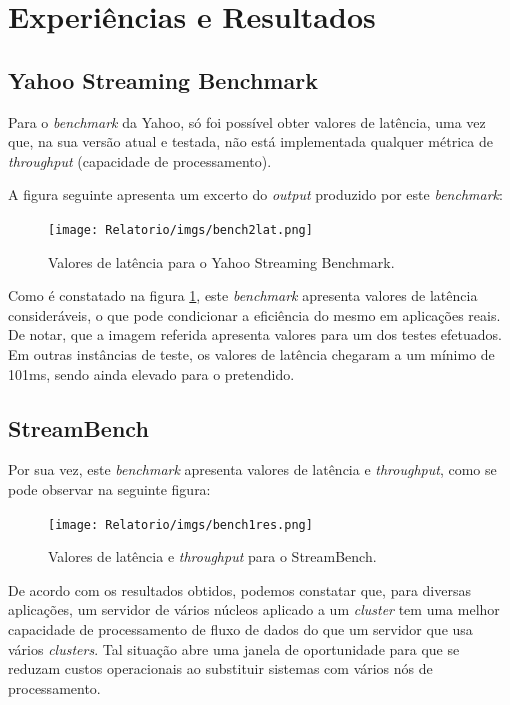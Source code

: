 \documentclass[conference]{IEEEtran}
\begin{document}
\section{Experiências e Resultados}
\label{resultados}

\subsection{Yahoo Streaming Benchmark}
\label{yahoo}

Para o \emph{benchmark} da Yahoo, só foi possível obter valores de latência, uma vez que, na sua versão atual e testada, não está implementada qualquer métrica de \emph{throughput} (capacidade de processamento). 

A figura seguinte apresenta um excerto do \emph{output} produzido por este \emph{benchmark}:

\begin{figure}[!htbp]
\centering
\texttt{[image: Relatorio/imgs/bench2lat.png]}
\caption{Valores de latência para o Yahoo Streaming Benchmark.}
\label{yahoo_res}
\end{figure}

Como é constatado na figura \ref{yahoo_res}, este \emph{benchmark} apresenta valores de latência consideráveis, o que pode condicionar a eficiência do mesmo em aplicações reais. De notar, que a imagem referida apresenta valores para um dos testes efetuados. Em outras instâncias de teste, os valores de latência chegaram a um mínimo de 101ms, sendo ainda elevado para o pretendido.

\subsection{StreamBench}
\label{stream}

Por sua vez, este \emph{benchmark} apresenta valores de latência e \emph{throughput}, como se pode observar na seguinte figura:

\begin{figure}[!htbp]
\centering
\texttt{[image: Relatorio/imgs/bench1res.png]}
\caption{Valores de latência e \emph{throughput} para o StreamBench.}
\label{stream_res}
\end{figure}

De acordo com os resultados obtidos, podemos constatar que, para diversas aplicações, um servidor de vários núcleos aplicado a um \emph{cluster} tem uma melhor capacidade de processamento de fluxo de dados do que um servidor que usa vários \emph{clusters}. Tal situação abre uma janela de oportunidade para que se reduzam custos operacionais ao substituir sistemas com vários nós de processamento.
\end{document}
